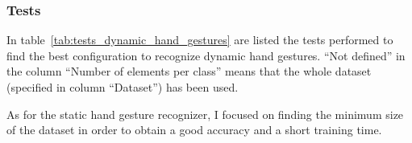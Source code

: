 \documentclass[../thesis.tex]{subfiles}
\begin{document}
\subsubsection{Tests}
In table~\ref{tab:tests_dynamic_hand_gestures} are listed the tests performed to find the best configuration to recognize dynamic hand gestures. ``Not defined'' in the column ``Number of elements per class'' means that the whole dataset (specified in column ``Dataset'') has been used.
\begin{table}[H]
As for the static hand gesture recognizer, I focused on finding the minimum size of the dataset in order to obtain a good accuracy and a short training time.
\caption{Training configurations for the dynamic hand gesture classifier.}
\label{tab:tests_dynamic_hand_gestures}
\end{table}
\end{document}
